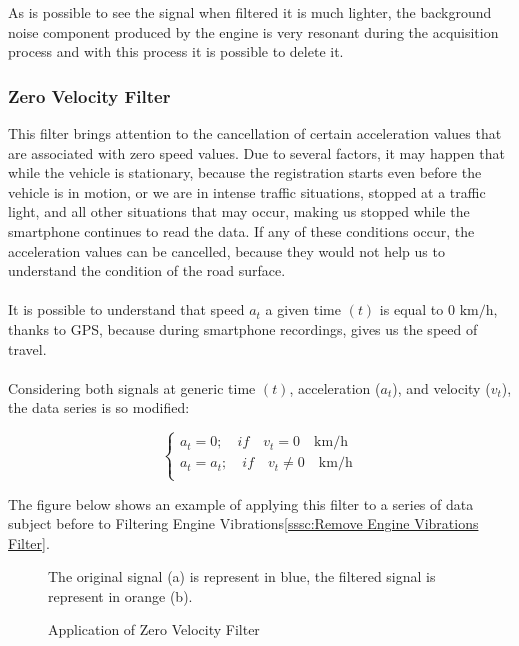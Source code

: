 \documentclass[tesi]{subfiles}
\begin{document}
\noindent As is possible to see the signal when filtered it is much lighter, the background noise component produced by the engine is very resonant during the acquisition process and with this process it is possible to delete it.
\clearpage
\subsubsection{Zero Velocity Filter}\label{sssc:Zero Velocity Filter}
This filter brings attention to the cancellation of certain acceleration values that are associated with zero speed values. Due to several factors, it may happen that while the vehicle is stationary,  because the registration starts even before the vehicle is in motion, or we are in intense traffic situations, stopped at a traffic light, and all other situations that may occur, making us stopped while the smartphone continues to read the data. If any of these conditions occur, the acceleration values can be cancelled, because they would not help us to understand the condition of the road surface.\\\\ \noindent It is possible to  understand that speed $a_{t}$ a given time $(t)$ is equal to $0$ $\si{\km\per\hour}$, thanks to GPS, because during smartphone recordings, gives us the speed of travel.\\\\
\noindent Considering both signals at generic time $(t)$, acceleration ($a_{t}$), and velocity ($v_{t}$), the data series is so modified:
\begin{center}
\[
    \left\{
                \begin{array}{ll}
                  a_{t} = 0; \quad 	if \quad v_{t} = 0 \quad \si{\km\per\hour}\\
                  a_{t} = a_{t}; \quad 	if \quad v_{t} \neq 0 \quad \si{\km\per\hour}\\
                \end{array}
              \right.
\]
\end{center}

\noindent The figure below shows an example of applying this filter to a series of data subject before to Filtering Engine Vibrations\ref{sssc:Remove Engine Vibrations Filter}.

\begin{figure}[H]	

\centering
{}

The original signal (a) is represent in blue, the filtered signal is represent in orange (b).

 \caption{Application of Zero Velocity Filter}
  \label{fig:Application of Zero Velocity Filter.}
\end{figure}
\clearpage
\end{document}
